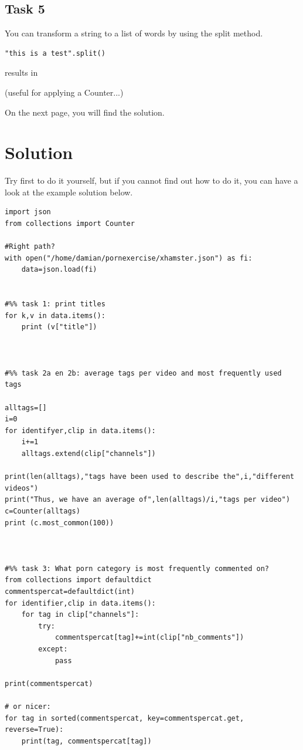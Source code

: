 \documentclass[a4paper,12pt]{book}
\begin{document}
\begin{appendices}
\subsection*{Task 5}
You can transform a string to a list of words by using the split method.
\begin{lstlisting}
"this is a test".split()
\end{lstlisting}
results in
\begin{lstlistingoutput}
\end{lstlistingoutput}
(useful for applying a Counter...)


On the next page, you will find the solution.

\newpage
\section{Solution}
Try first to do it yourself, but if you cannot find out how to do it, you can have a look at the example solution below.

\begin{lstlisting}
import json
from collections import Counter

#Right path?
with open("/home/damian/pornexercise/xhamster.json") as fi:
    data=json.load(fi)


#%% task 1: print titles
for k,v in data.items():
    print (v["title"])



#%% task 2a en 2b: average tags per video and most frequently used tags

alltags=[]
i=0
for identifyer,clip in data.items():
    i+=1
    alltags.extend(clip["channels"])

print(len(alltags),"tags have been used to describe the",i,"different videos")
print("Thus, we have an average of",len(alltags)/i,"tags per video")
c=Counter(alltags)
print (c.most_common(100))



#%% task 3: What porn category is most frequently commented on?
from collections import defaultdict
commentspercat=defaultdict(int)
for identifier,clip in data.items():
    for tag in clip["channels"]:
        try:
            commentspercat[tag]+=int(clip["nb_comments"])
        except:
            pass

print(commentspercat)

# or nicer:
for tag in sorted(commentspercat, key=commentspercat.get, reverse=True):
    print(tag, commentspercat[tag])




\end{lstlisting}
\end{appendices}
\end{document}
